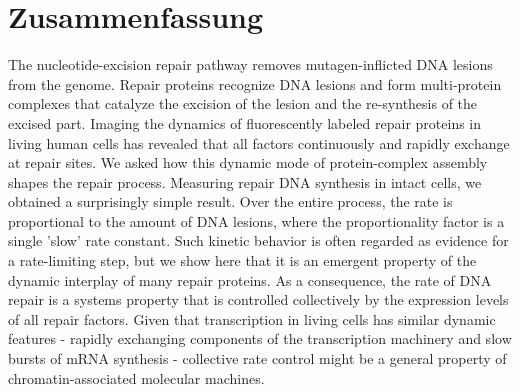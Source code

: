 \chapter*{Zusammenfassung}
The nucleotide-excision repair pathway removes mutagen-inflicted DNA lesions from the genome. Repair proteins recognize DNA lesions and form multi-protein complexes that catalyze the excision of the lesion and the re-synthesis of the excised part. Imaging the dynamics of fluorescently labeled repair proteins in living human cells has revealed that all factors continuously and rapidly exchange at repair sites. We asked how this dynamic mode of protein-complex assembly shapes the repair process. Measuring repair DNA synthesis in intact cells, we obtained a surprisingly simple result. Over the entire process, the rate is proportional to the amount of DNA lesions, where the proportionality factor is a single 'slow' rate constant. Such kinetic behavior is often regarded as evidence for a rate-limiting step, but we show here that it is an emergent property of the dynamic interplay of many repair proteins. As a consequence, the rate of DNA repair is a systems property that is controlled collectively by the expression levels of all repair factors. Given that transcription in living cells has similar dynamic features - rapidly exchanging components of the transcription machinery and slow bursts of mRNA synthesis - collective rate control might be a general property of chromatin-associated molecular machines.


